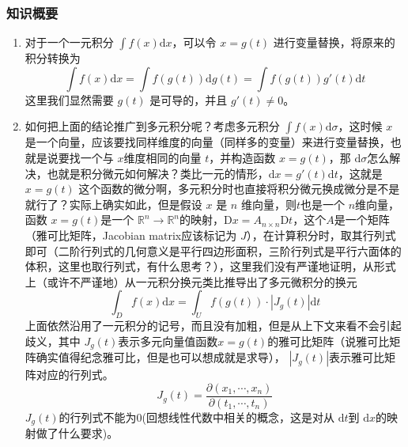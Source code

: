 \subsubsection{知识概要}
\begin{enumerate}
    \item 对于一个一元积分 $\int f(x) \mathrm{d} x$，可以令 $x = g(t)$ 进行变量替换，将原来的积分转换为
    $$
    \int f(x) \mathrm{d} x = \int f(g(t)) \mathrm{d} g(t) = \int f(g(t)) g'(t) \mathrm{d} t
    $$
    这里我们显然需要 $g(t)$ 是可导的，并且 $g'(t) \neq 0$。

    \item 如何把上面的结论推广到多元积分呢？考虑多元积分 $\int f(x) \mathrm{d} \sigma$，这时候 $x$ 是一个向量，应该要找同样维度的向量（同样多的变量）来进行变量替换，也就是说要找一个与 $x$维度相同的向量 $t$，并构造函数 $x = g(t)$，那 $\mathrm{d} \sigma $怎么解决，也就是积分微元如何解决？类比一元的情形，$\mathrm{d} x = g'(t) \mathrm{d} t $，这就是 $x = g(t)$ 这个函数的微分啊，多元积分时也直接将积分微元换成微分是不是就行了？实际上确实如此，但是假设 $x$ 是 $n$ 维向量，则$t$也是一个 $n$维向量，函数 $x = g(t)$是一个 $\mathbb{R}^n \to \mathbb{R}^n $的映射，$\mathrm{D} x = A_{n \times n} \mathrm{D}t$，这个$A$是一个矩阵（雅可比矩阵，Jacobian matrix应该标记为 $J$），在计算积分时，取其行列式即可（二阶行列式的几何意义是平行四边形面积，三阶行列式是平行六面体的体积，这里也取行列式，有什么思考？），这里我们没有严谨地证明，从形式上（或许不严谨地）从一元积分换元类比推导出了多元微积分的换元
    $$
    \int _D f(x) \mathrm{d} x = \int _U f(g(t)) \cdot |J_g(t)| \mathrm{d}t
    $$
    上面依然沿用了一元积分的记号，而且没有加粗，但是从上下文来看不会引起歧义，其中 $J_g(t)$表示多元向量值函数$x = g(t)$的雅可比矩阵（说雅可比矩阵确实值得纪念雅可比，但是也可以想成就是求导）， $|J_g(t)|$表示雅可比矩阵对应的行列式。
    $$
    J_g(t) =\frac{\partial(x_1,\cdots,x_n)}{\partial(t_1,\cdots,t_n)}
    $$
    $J_g(t)$的行列式不能为0(回想线性代数中相关的概念，这是对从 $\mathrm{d} t$到 $\mathrm{d} x$的映射做了什么要求)。


\end{enumerate}
